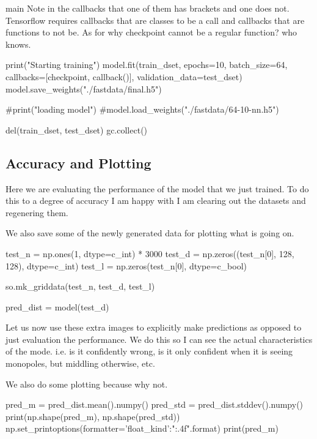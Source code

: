 \documentclass[10pt, a4paper]{article}
\begin{document}
\begin{codeblock}{main}
Note in the callbacks that one of them has brackets and one does not. Tensorflow requires callbacks that are classes to be a call and callbacks that are functions to not be. As for why checkpoint cannot be a regular function? who knows. 

\begin{code}
	print("Starting training")
	model.fit(train_dset, epochs=10, batch_size=64, callbacks=[checkpoint, callback()], validation_data=test_dset)
	model.save_weights("./fastdata/final.h5")
\end{code}
\begin{code}
	#print("loading model")
	#model.load_weights("./fastdata/64-10-nn.h5")
\end{code}
\begin{code}
	del(train_dset, test_dset)
	gc.collect()
\end{code}

\subsection{Accuracy and Plotting}

Here we are evaluating the performance of the model that we just trained. To do this to a degree of accuracy I am happy with I am clearing out the datasets and regenering them. 

We also save some of the newly generated data for plotting what is going on.

\begin{code}
	test_n = np.ones(1, dtype=c_int) * 3000
	test_d = np.zeros((test_n[0], 128, 128), dtype=c_int)
	test_l = np.zeros(test_n[0], dtype=c_bool)
	
	so.mk_griddata(test_n, test_d, test_l)
	
	pred_dist = model(test_d)
\end{code}

Let us now use these extra images to explicitly make predictions as opposed to just evaluation the performance. We do this so I can see the actual characteristics of the mode. i.e. is it confidently wrong, is it only confident when it is seeing monopoles, but middling otherwise, etc. 

We also do some plotting because why not.

\begin{code}
	pred_m = pred_dist.mean().numpy()
	pred_std = pred_dist.stddev().numpy()
	print(np.shape(pred_m), np.shape(pred_std))
	np.set_printoptions(formatter={'float_kind':"{:.4f}".format})
	print(pred_m)
\end{code}


\end{codeblock}
\end{document}
